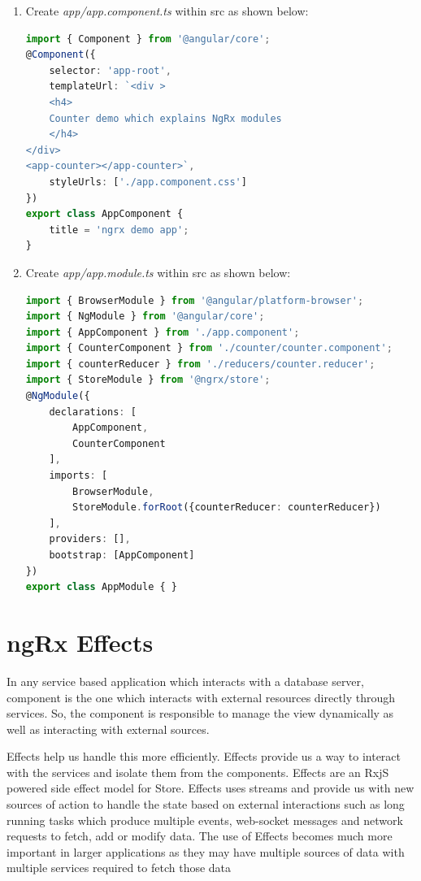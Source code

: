 \documentclass{report}
\begin{document}
\begin{enumerate}
\begin{lstlisting}[language=HTML, caption=app/counter/counter.component.html]
\end{lstlisting}
\item{Create \textit{app/app.component.ts} within src as shown below:}
	\begin{lstlisting}[language=Typescript, caption=app/app.component.ts]
	import { Component } from '@angular/core';
@Component({
	selector: 'app-root',
	templateUrl: `<div >
	<h4>
	Counter demo which explains NgRx modules
	</h4>
</div>
<app-counter></app-counter>`,
	styleUrls: ['./app.component.css']
})
export class AppComponent {
	title = 'ngrx demo app';
}

\end{lstlisting}
\item{ Create \textit{app/app.module.ts} within src as shown below:}
	\begin{lstlisting}[language=Typescript, caption=app/app.module.ts]
	import { BrowserModule } from '@angular/platform-browser';
import { NgModule } from '@angular/core';
import { AppComponent } from './app.component';
import { CounterComponent } from './counter/counter.component';
import { counterReducer } from './reducers/counter.reducer';
import { StoreModule } from '@ngrx/store';
@NgModule({
	declarations: [
		AppComponent,
		CounterComponent
	],
	imports: [
		BrowserModule,
		StoreModule.forRoot({counterReducer: counterReducer})
	],
	providers: [],
	bootstrap: [AppComponent]
})
export class AppModule { }
\end{lstlisting}

\end{enumerate}

\section{ngRx Effects}
In any service based application which interacts with a database server, component is the one which interacts with external resources directly through services. So, the component is responsible to manage the view dynamically as well as interacting with external sources.

Effects help us handle this more efficiently. Effects provide us a way to interact with the services and isolate them from the components.
Effects are an RxjS powered side effect model for Store. Effects uses streams and provide us with new sources of action to handle the state based on external interactions such as long running tasks which produce multiple events, web-socket messages and network requests to fetch, add or modify data.
The use of Effects becomes much more important in larger applications as they may have multiple sources of data with multiple services required to fetch those data
\end{document}
